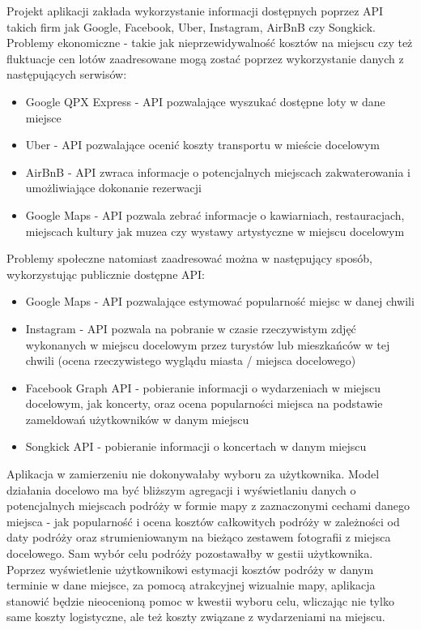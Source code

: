 \documentclass[oneside]{mgr}
\begin{document}
Projekt aplikacji zakłada wykorzystanie informacji dostępnych poprzez API takich firm jak Google, Facebook, Uber, Instagram, AirBnB czy Songkick. Problemy ekonomiczne - takie jak nieprzewidywalność kosztów na miejscu czy też fluktuacje cen lotów zaadresowane mogą zostać poprzez wykorzystanie danych z następujących serwisów:
\begin{itemize}
	\item Google QPX Express - API pozwalające wyszukać dostępne loty w dane miejsce
	\item Uber - API pozwalające ocenić koszty transportu w mieście docelowym
	\item AirBnB - API zwraca informacje o potencjalnych miejscach zakwaterowania i umożliwiające dokonanie rezerwacji
	\item Google Maps - API pozwala zebrać informacje o kawiarniach, restauracjach, miejscach kultury jak muzea czy wystawy artystyczne w miejscu docelowym
\end{itemize}


Problemy społeczne natomiast zaadresować można w następujący sposób, wykorzystując publicznie dostępne API:
\begin{itemize}
	\item Google Maps - API pozwalające estymować popularność miejsc w danej chwili
	\item Instagram - API pozwala na pobranie w czasie rzeczywistym zdjęć wykonanych w miejscu docelowym przez turystów lub mieszkańców w tej chwili (ocena rzeczywistego wyglądu miasta / miejsca docelowego)
	\item Facebook Graph API - pobieranie informacji o wydarzeniach w miejscu docelowym, jak koncerty, oraz ocena popularności miejsca na podstawie zameldowań użytkowników w danym miejscu
	\item Songkick API - pobieranie informacji o koncertach w danym miejscu
\end{itemize}

Aplikacja w zamierzeniu nie dokonywałaby wyboru za użytkownika. Model działania docelowo ma być bliższym agregacji i wyświetlaniu danych o potencjalnych miejscach podróży w formie mapy z zaznaczonymi cechami danego miejsca - jak popularność i ocena kosztów całkowitych podróży w zależności od daty podróży oraz strumieniowanym na bieżąco zestawem fotografii z miejsca docelowego. Sam wybór celu podróży pozostawałby w gestii użytkownika. Poprzez wyświetlenie użytkownikowi estymacji kosztów podróży w danym terminie w dane miejsce, za pomocą atrakcyjnej wizualnie mapy, aplikacja stanowić będzie nieocenioną pomoc w kwestii wyboru celu, wliczając nie tylko same koszty logistyczne, ale też koszty związane z wydarzeniami na miejscu.
\end{document}

